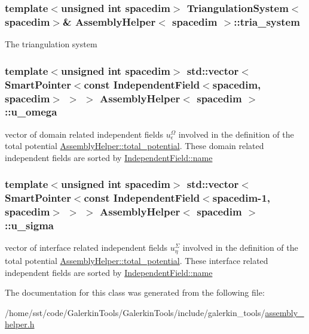 \subsubsection[{\texorpdfstring{tria\+\_\+system}{tria_system}}]{\setlength{\rightskip}{0pt plus 5cm}template$<$unsigned int spacedim$>$ {\bf Triangulation\+System}$<$spacedim$>$\& {\bf Assembly\+Helper}$<$ spacedim $>$\+::tria\+\_\+system\hspace{0.3cm}{\ttfamily [private]}}\hypertarget{class_assembly_helper_add08a8a7bb9c9325fcc7d92bfce525d4}{}\label{class_assembly_helper_add08a8a7bb9c9325fcc7d92bfce525d4}
The triangulation system 
\subsubsection[{\texorpdfstring{u\+\_\+omega}{u_omega}}]{\setlength{\rightskip}{0pt plus 5cm}template$<$unsigned int spacedim$>$ std\+::vector$<${\bf Smart\+Pointer}$<$const {\bf Independent\+Field}$<$spacedim, spacedim$>$ $>$ $>$ {\bf Assembly\+Helper}$<$ spacedim $>$\+::u\+\_\+omega\hspace{0.3cm}{\ttfamily [private]}}\hypertarget{class_assembly_helper_a1952a054a839a7a683ca108013e7d976}{}\label{class_assembly_helper_a1952a054a839a7a683ca108013e7d976}
vector of domain related independent fields $u^\Omega_\epsilon$ involved in the definition of the total potential \hyperlink{class_assembly_helper_a748eed9d73b7437a4bf2dcd73108790b}{Assembly\+Helper\+::total\+\_\+potential}. These domain related independent fields are sorted by \hyperlink{class_independent_field_ae05f8565e4ce1a70b5b833555dc084b5}{Independent\+Field\+::name} 
\subsubsection[{\texorpdfstring{u\+\_\+sigma}{u_sigma}}]{\setlength{\rightskip}{0pt plus 5cm}template$<$unsigned int spacedim$>$ std\+::vector$<${\bf Smart\+Pointer}$<$const {\bf Independent\+Field}$<$spacedim-\/1, spacedim$>$ $>$ $>$ {\bf Assembly\+Helper}$<$ spacedim $>$\+::u\+\_\+sigma\hspace{0.3cm}{\ttfamily [private]}}\hypertarget{class_assembly_helper_a696fe649b3503561235aa1ccbf2ddeef}{}\label{class_assembly_helper_a696fe649b3503561235aa1ccbf2ddeef}
vector of interface related independent fields $u^\Sigma_\eta$ involved in the definition of the total potential \hyperlink{class_assembly_helper_a748eed9d73b7437a4bf2dcd73108790b}{Assembly\+Helper\+::total\+\_\+potential}. These interface related independent fields are sorted by \hyperlink{class_independent_field_ae05f8565e4ce1a70b5b833555dc084b5}{Independent\+Field\+::name} 

The documentation for this class was generated from the following file\+:\begin{DoxyCompactItemize}
\item 
/home/sst/code/\+Galerkin\+Tools/\+Galerkin\+Tools/include/galerkin\+\_\+tools/\hyperlink{assembly__helper_8h}{assembly\+\_\+helper.\+h}\end{DoxyCompactItemize}
